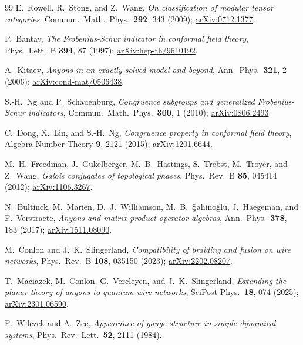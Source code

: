 \documentclass[aps,pra,twocolumn,superscriptaddress,longbibliography,floatfix,nofootinbib]{revtex4-2}
\begin{document}
\begin{thebibliography}{99}
E.~Rowell, R.~Stong, and Z.~Wang,
\emph{On classification of modular tensor categories},
Commun.\ Math.\ Phys.\ \textbf{292}, 343 (2009);
\href{https://arxiv.org/abs/0712.1377}{arXiv:0712.1377}.

P.~Bantay,
\emph{The Frobenius-Schur indicator in conformal field theory},
Phys.\ Lett.\ B \textbf{394}, 87 (1997);
\href{https://arxiv.org/abs/hep-th/9610192}{arXiv:hep-th/9610192}.

A.~Kitaev,
\emph{Anyons in an exactly solved model and beyond},
Ann.\ Phys.\ \textbf{321}, 2 (2006);
\href{https://arxiv.org/abs/cond-mat/0506438}{arXiv:cond-mat/0506438}.

S.-H.~Ng and P.~Schauenburg,
\emph{Congruence subgroups and generalized Frobenius-Schur indicators},
Commun.\ Math.\ Phys.\ \textbf{300}, 1 (2010);
\href{https://arxiv.org/abs/0806.2493}{arXiv:0806.2493}.

C.~Dong, X.~Lin, and S.-H.~Ng,
\emph{Congruence property in conformal field theory},
Algebra Number Theory \textbf{9}, 2121 (2015);
\href{https://arxiv.org/abs/1201.6644}{arXiv:1201.6644}.

M.~H.~Freedman, J.~Gukelberger, M.~B.~Hastings, S.~Trebst,
M.~Troyer, and Z.~Wang,
\emph{Galois conjugates of topological phases},
Phys.\ Rev.\ B \textbf{85}, 045414 (2012);
\href{https://arxiv.org/abs/1106.3267}{arXiv:1106.3267}.

N.~Bultinck, M.~Mari\"en, D.~J.~Williamson, M.~B.~\c{S}ahino\u{g}lu,
J.~Haegeman, and F.~Verstraete,
\emph{Anyons and matrix product operator algebras},
Ann.\ Phys.\ \textbf{378}, 183 (2017);
\href{https://arxiv.org/abs/1511.08090}{arXiv:1511.08090}.

M.~Conlon and J.~K.~Slingerland,
\emph{Compatibility of braiding and fusion on wire networks},
Phys.\ Rev.\ B \textbf{108}, 035150 (2023);
\href{https://arxiv.org/abs/2202.08207}{arXiv:2202.08207}.

T.~Maciazek, M.~Conlon, G.~Vercleyen, and J.~K.~Slingerland,
\emph{Extending the planar theory of anyons to quantum wire networks},
SciPost Phys.\ \textbf{18}, 074 (2025);
\href{https://arxiv.org/abs/2301.06590}{arXiv:2301.06590}.

F.~Wilczek and A.~Zee,
\emph{Appearance of gauge structure in simple dynamical systems},
Phys.\ Rev.\ Lett.\ \textbf{52}, 2111 (1984).


\end{thebibliography}
\end{document}
